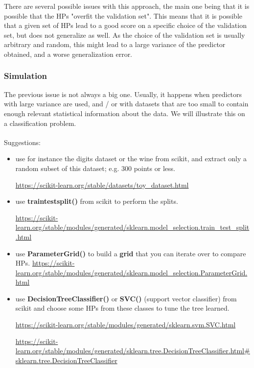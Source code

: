 \documentclass[
10pt, %
a4paper, %
oneside, %
headinclude,footinclude, %
BCOR5mm, %
]{scrartcl}
\begin{document}
There are several possible issues with this approach, the main one being that it is possible that the HPs "overfit the validation set". This means that it is possible that a given set of HPs lead to a good score on a specific choice of the validation set, but does not generalize as well. As the choice of the validation set is usually arbitrary and random, this might lead to a large variance of the predictor obtained, and a worse generalization error.

\subsubsection{Simulation}%
\label{ssub:Simulation}

The previous issue is not always a big one. Usually, it happens when predictors
with large variance are used, and / or with datasets that are too small to
contain enough relevant statistical information about the data. We will
illustrate this on a classification problem.
\\

{\color{Purple}{Perform a simulation with the train / validation / test split in order to perform a hyperparameter tuning for which the test score is significantly, and robustly worse than the validation score.}}
\\

Suggestions:
\begin{itemize}
	\item use for instance the digits dataset or the wine from scikit, and
        extract only a random subset of this dataset; e.g. $300$ points or
        less.

        \url{https://scikit-learn.org/stable/datasets/toy_dataset.html} 

	\item use \textbf{train\textunderscore test\textunderscore split()} from scikit to perform the splits.

	    \url{https://scikit-learn.org/stable/modules/generated/sklearn.model_selection.train_test_split.html} 

	\item use \textbf{ParameterGrid()} to build a \textbf{grid} that you can iterate over to compare HPs.
	    \url{https://scikit-learn.org/stable/modules/generated/sklearn.model_selection.ParameterGrid.html} 
    \item use \textbf{DecisionTreeClassifier()} or \textbf{SVC()} (support
        vector classifier) from scikit and choose some HPs from these classes to tune the tree learned.

        \url{https://scikit-learn.org/stable/modules/generated/sklearn.svm.SVC.html} 


	    \url{https://scikit-learn.org/stable/modules/generated/sklearn.tree.DecisionTreeClassifier.html#sklearn.tree.DecisionTreeClassifier}
\end{itemize}
\end{document}
